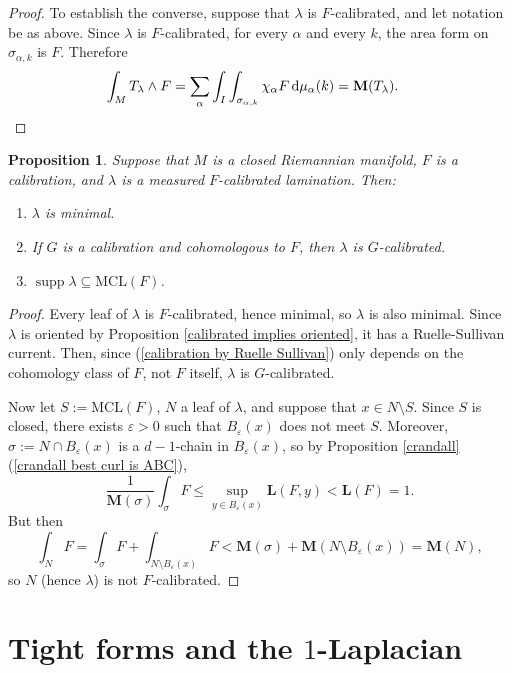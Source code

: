 \documentclass[reqno,11pt]{amsart}
\newcommand*\dif{\mathop{}\!\mathrm{d}}
\DeclareMathOperator{\supp}{supp}
\newcommand{\MCL}{\mathrm{MCL}}
\newcommand{\Mass}{\mathbf M}
\newcommand{\Comass}{\mathbf L}
\newtheorem{proposition}[theorem]{Proposition}
\theoremstyle{definition}
\numberwithin{equation}{section}
\begin{document}
\begin{proof}
To establish the converse, suppose that $\lambda$ is $F$-calibrated, and let notation be as above.
Since $\lambda$ is $F$-calibrated, for every $\alpha$ and every $k$, the area form on $\sigma_{\alpha, k}$ is $F$. Therefore
\begin{align*}
\int_M T_\lambda \wedge F &= \sum_\alpha \int_I \int_{\sigma_{\alpha, k}} \chi_\alpha F \dif \mu_\alpha(k) = \Mass(T_\lambda). \qedhere
\end{align*}
\end{proof}

\begin{proposition}\label{properties of calibrated laminations}
Suppose that $M$ is a closed Riemannian manifold, $F$ is a calibration, and $\lambda$ is a measured $F$-calibrated lamination.
Then:
\begin{enumerate}
\item $\lambda$ is minimal.
\item If $G$ is a calibration and cohomologous to $F$, then $\lambda$ is $G$-calibrated.
\item $\supp \lambda \subseteq \MCL(F)$.
\end{enumerate}
\end{proposition}
\begin{proof}
Every leaf of $\lambda$ is $F$-calibrated, hence minimal, so $\lambda$ is also minimal.
Since $\lambda$ is oriented by Proposition \ref{calibrated implies oriented}, it has a Ruelle-Sullivan current.
Then, since (\ref{calibration by Ruelle Sullivan}) only depends on the cohomology class of $F$, not $F$ itself, $\lambda$ is $G$-calibrated.

Now let $S := \MCL(F)$, $N$ a leaf of $\lambda$, and suppose that $x \in N \setminus S$.
Since $S$ is closed, there exists $\varepsilon > 0$ such that $B_\varepsilon(x)$ does not meet $S$.
Moreover, $\sigma := N \cap B_\varepsilon(x)$ is a $d-1$-chain in $B_\varepsilon(x)$, so by Proposition \ref{crandall}(\ref{crandall best curl is ABC}),
$$\frac{1}{\Mass(\sigma)} \int_\sigma F \leq \sup_{y \in B_\varepsilon(x)} \Comass(F, y) < \Comass(F) = 1.$$
But then 
$$\int_N F = \int_\sigma F + \int_{N \setminus B_\varepsilon(x)} F < \Mass(\sigma) + \Mass(N \setminus B_\varepsilon(x)) = \Mass(N),$$
so $N$ (hence $\lambda$) is not $F$-calibrated.
\end{proof}


\section{\texorpdfstring{Tight forms and the $1$-Laplacian}{Infinity-tight forms and the one-Laplacian}}\label{tight forms sec}
\end{document}
